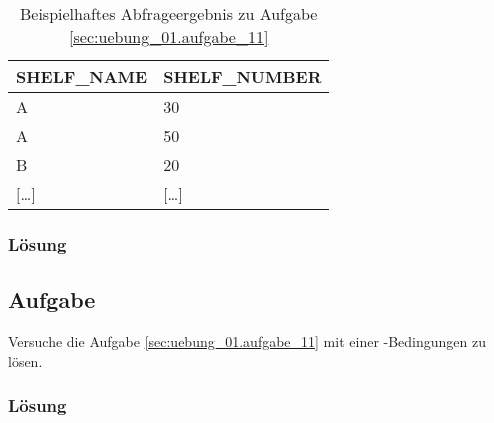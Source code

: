 \begin{table}[H]
  \ttfamily
  \begin{tabularx}{\textwidth}{X|X}
    \textbf{SHELF\_NAME} & \textbf{SHELF\_NUMBER} \\
    \hline\hline
    A & 30 \\
    A & 50 \\
    B & 20 \\
    $[$\dots$]$ & $[$\dots$]$ \\
  \end{tabularx}
  \caption{Beispielhaftes Abfrageergebnis zu Aufgabe \ref{sec:uebung_01.aufgabe_11}}
  \label{tbl:uebung_01.aufgabe_11}
\end{table}

\subsubsection*{Lösung}
\label{sec:uebung_01.aufgabe_11.loesung}

\subsection{Aufgabe}
\label{sec:uebung_01.aufgabe_12}
Versuche die Aufgabe \ref{sec:uebung_01.aufgabe_11} mit einer -Bedingungen zu lösen.

\subsubsection*{Lösung}
\label{sec:uebung_01.aufgabe_12.loesung}
